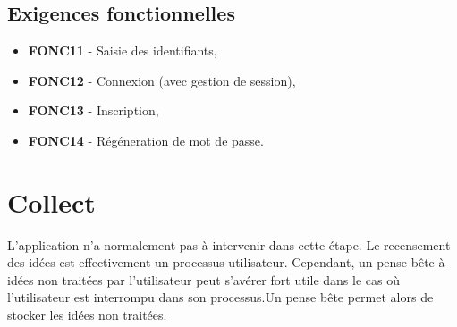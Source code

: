 \subsection{Exigences fonctionnelles}


\begin{itemize}	\renewcommand{\labelitemi}{}
	\item \textbf{FONC11} - Saisie des identifiants,
	\item \textbf{FONC12} - Connexion (avec gestion de session),
	\item \textbf{FONC13} - Inscription,
	\item \textbf{FONC14} - Régéneration de mot de passe.\\
\end{itemize}

\section{Collect}

L'application n'a normalement pas à intervenir dans cette étape. Le recensement des idées est effectivement un processus utilisateur. Cependant, un pense-bête à idées non traitées par l'utilisateur peut s'avérer fort utile dans le cas où l'utilisateur est interrompu dans son processus.Un pense bête permet alors de stocker les idées non traitées.


